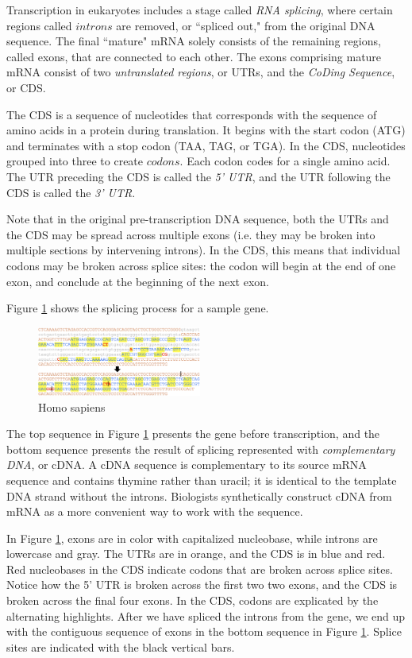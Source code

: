 \documentclass[letterpaper]{article}
\begin{document}
Transcription in eukaryotes includes a stage called \textit{RNA splicing}, where certain regions called $introns$ are removed, or ``spliced out," from the original DNA sequence. The final ``mature" mRNA solely consists of the remaining regions, called exons, that are connected to each other. The exons comprising mature mRNA consist of two \textit{untranslated regions}, or UTRs, and the \textit{CoDing Sequence}, or CDS. 

The CDS is a sequence of nucleotides that corresponds with the sequence of amino acids in a protein during translation. It begins with the start codon (ATG) and terminates with a stop codon (TAA, TAG, or TGA). In the CDS, nucleotides grouped into three to create $codons$. Each codon codes for a single amino acid. The UTR preceding the CDS is called the \textit{5' UTR}, and the UTR following the CDS is called the \textit{3' UTR}.

Note that in the original pre-transcription DNA sequence, both the UTRs and the CDS may be spread across multiple exons (i.e. they may be broken into multiple sections by intervening introns). In the CDS, this means that individual codons may be broken across splice sites: the codon will begin at the end of one exon, and conclude at the beginning of the next exon.

Figure \ref{fig:gene} shows the splicing process for a sample gene. 

\begin{figure}[h!]
\centering
\includegraphics[width=0.48\textwidth]{images/gene.png}
  \caption{Homo sapiens}\label{fig:gene}
  \vspace{-3mm}
\end{figure}

The top sequence in Figure \ref{fig:gene} presents the gene before transcription, and the bottom sequence presents the result of splicing represented with \textit{complementary DNA}, or cDNA. A cDNA sequence is complementary to its source mRNA sequence and contains thymine rather than uracil; it is identical to the template DNA strand without the introns. Biologists synthetically construct cDNA from mRNA as a more convenient way to work with the sequence.

In Figure \ref{fig:gene}, exons are in color with capitalized nucleobase, while introns are lowercase and gray. The UTRs are in orange, and the CDS is in blue and red. Red nucleobases in the CDS indicate codons that are broken across splice sites. Notice how the 5' UTR is broken across the first two two exons, and the CDS is broken across the final four exons. In the CDS, codons are explicated by the alternating highlights. After we have spliced the introns from the gene, we end up with the contiguous sequence of exons in the bottom sequence in Figure \ref{fig:gene}. Splice sites are indicated with the black vertical bars.
\end{document}
